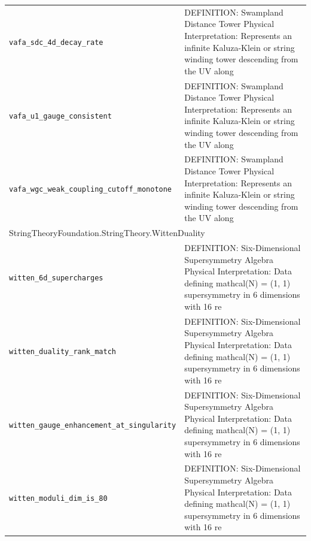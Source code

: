 \begin{longtable}{p{}p{}}
\quad\texttt{\footnotesize vafa\_sdc\_4d\_decay\_rate} & {\footnotesize DEFINITION: Swampland Distance Tower Physical Interpretation: Represents an infinite Kaluza-Klein or string winding tower descending from the UV along} \\
\quad\texttt{\footnotesize vafa\_u1\_gauge\_consistent} & {\footnotesize DEFINITION: Swampland Distance Tower Physical Interpretation: Represents an infinite Kaluza-Klein or string winding tower descending from the UV along} \\
\quad\texttt{\footnotesize vafa\_wgc\_weak\_coupling\_cutoff\_monotone} & {\footnotesize DEFINITION: Swampland Distance Tower Physical Interpretation: Represents an infinite Kaluza-Klein or string winding tower descending from the UV along} \\
\multicolumn{2}{l}{\textsf{\small StringTheoryFoundation.StringTheory.WittenDuality}} \\
\quad\texttt{\footnotesize witten\_6d\_supercharges} & {\footnotesize DEFINITION: Six-Dimensional Supersymmetry Algebra Physical Interpretation: Data defining  mathcal(N) = (1, 1) supersymmetry in 6 dimensions with 16 re} \\
\quad\texttt{\footnotesize witten\_duality\_rank\_match} & {\footnotesize DEFINITION: Six-Dimensional Supersymmetry Algebra Physical Interpretation: Data defining  mathcal(N) = (1, 1) supersymmetry in 6 dimensions with 16 re} \\
\quad\texttt{\footnotesize witten\_gauge\_enhancement\_at\_singularity} & {\footnotesize DEFINITION: Six-Dimensional Supersymmetry Algebra Physical Interpretation: Data defining  mathcal(N) = (1, 1) supersymmetry in 6 dimensions with 16 re} \\
\quad\texttt{\footnotesize witten\_moduli\_dim\_is\_80} & {\footnotesize DEFINITION: Six-Dimensional Supersymmetry Algebra Physical Interpretation: Data defining  mathcal(N) = (1, 1) supersymmetry in 6 dimensions with 16 re} \\
\end{longtable}
